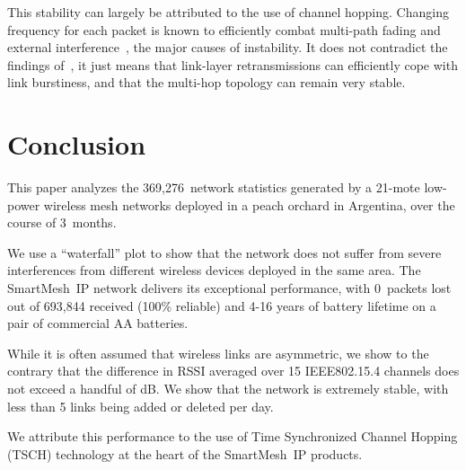 \documentclass{sig-alternate}
\newcommand{\smip}                {SmartMesh~IP\xspace}
\newcommand{\NUMSTATS}            {369,276\xspace}
\begin{document}

This stability can largely be attributed to the use of channel hopping.
Changing frequency for each packet is known to efficiently combat multi-path fading and external interference~\cite{watteyne09reliability}, the major causes of instability.
It does not contradict the findings of~\cite{srinivasan08beta}, it just means that link-layer retransmissions can efficiently cope with link burstiness, and that the multi-hop topology can remain very stable.

\newpage

\section{Conclusion}
\label{sec:conclusion}


This paper analyzes the \NUMSTATS~network statistics generated by a 21-mote low-power wireless mesh networks deployed in a peach orchard in Argentina, over the course of 3~months.


We use a ``waterfall'' plot to show that the network does not suffer from severe interferences from different wireless devices deployed in the same area.
The \smip network delivers its exceptional performance, with 0~packets lost out of 693,844 received (100\% reliable) and 4-16 years of battery lifetime on a pair of commercial AA batteries.


While it is often assumed that wireless links are asymmetric, we show to the contrary that the difference in RSSI averaged over 15 IEEE802.15.4 channels does not exceed a handful of dB.
We show that the network is extremely stable, with less than 5 links being added or deleted per day.


We attribute this performance to the use of Time Synchronized Channel Hopping (TSCH) technology at the heart of the \smip products.

%
%
\end{document}
